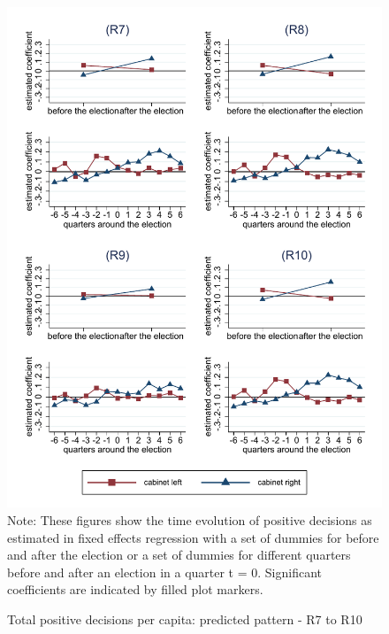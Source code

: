 \documentclass[11pt,a4paper]{scrartcl}
\begin{document}
\clearpage
\FloatBarrier
\begin{figure}[!ht]
	\caption{Total positive decisions per capita: predicted pattern - R7 to R10}
	\includegraphics[width=1\textwidth]{../results/decisions/log_totalpositive_pc_graphs_R7-R10.pdf}
	\scriptsize{Note: These figures show the time evolution of positive decisions as estimated in fixed effects regression with a set of dummies for before and after the election or a set of dummies for different quarters before and after an election in a quarter t = 0. Significant coefficients are indicated by filled plot markers.}
\end{figure}




\clearpage
\FloatBarrier

\end{document}

